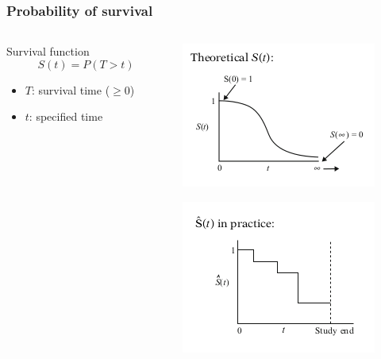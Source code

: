 \documentclass{beamer} \usepackage{amsmath,amsthm}
\begin{document}
\begin{frame}
  \frametitle{Probability of survival}

  \begin{columns}
    \begin{column}{0.5\textwidth}
      \begin{block}{Survival function}
        \[
          S(t) = P(T > t)
        \]

        \begin{itemize}
          \item \(T\): survival time (\(\geq 0\))
          \item \(t\): specified time 
        \end{itemize}
    \end{block}

    \end{column}
    \begin{column}{0.5\textwidth} 
      \includegraphics[height = 0.4\textheight, width = \textwidth, keepaspectratio = true]{figure/ideal}

      \includegraphics[height = 0.4\textheight, width = \textwidth, keepaspectratio = true]{figure/prac}

      \tiny{}
    \end{column}
  \end{columns}
\end{frame}
\end{document}
